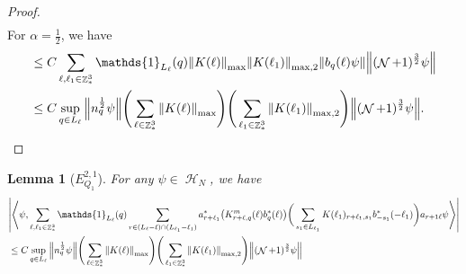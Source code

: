 \documentclass[sn-mathphys, Numbered ,a4paper]{sn-jnl}%
\DeclareMathOperator{\Z}{\mathbb{Z}}
\DeclareMathOperator{\HH}{\mathcal{H}}
\DeclareMathOperator{\NN}{\mathcal{N}}
\newcommand{\half}{\frac{1}{2}}
\newcommand{\eva}[1]{\left\langle #1 \right\rangle}
\theoremstyle{plain}
\newtheorem{lemma}[theorem]{Lemma}
\theoremstyle{definition}
\theoremstyle{remark}
\theoremstyle{plain}
\theoremstyle{definition}
\theoremstyle{remark}
\begin{document}
\begin{proof}
\begin{align}
    \end{align}
    For $\alpha = \half$, we have
    \begin{align}
    &\leq C\sum\limits_{\ell,\ell_1 \in \Z^3_*} \mathds{1}_{L_\ell}(q) \norm{K(\ell)}_{\mathrm{max}}\norm{K(\ell_1)}_{\mathrm{max},2}  \norm{b_{q}(\ell) \psi} \norm { (\NN+1)^{\frac{3}{2}} \psi }\nonumber\\
    &\leq C \sup\limits_{q \in L_\ell} \norm{n_{q}^{\half} \psi} \Bigg(\sum\limits_{\ell \in \Z^3_*} \norm{K(\ell)}_{\mathrm{max}}\Bigg)\Bigg( \sum\limits_{\ell_1 \in \Z^3_*}\norm{K(\ell_1)}_{\mathrm{max},2} \Bigg)  \norm { (\NN+1)^{\frac{3}{2}} \psi }. \label{eq:preleadbosest}
    \end{align}
\end{proof}
\begin{lemma}[$E_{Q_1}^{2,1}$]
	For any $\psi \in \HH_N$, we have
	\begin{align}
		&\abs{\eva{\psi,\sum\limits_{\ell,\ell_1 \in \Z^3_*} \mathds{1}_{L_\ell}(q) \sum\limits_{r \in (L_\ell-\ell) \cap (L_{\ell_1}-\ell_1)}a^*_{r+\ell_1} 
				\big(K^{m}_{r+\ell,q}(\ell)b^*_{q}(\ell)\big) \bigg( \sum\limits_{s_1 \in L_{\ell_1}} K(\ell_1)_{r+\ell_1,s_1}b^*_{-s_1}(-\ell_1) \bigg) a_{r+1\ell} \psi }}\nonumber\\
		&\leq  C \sup\limits_{q \in L_\ell} \norm{n_{q}^{\half} \psi} \Bigg(\sum\limits_{\ell \in \Z^3_*} \norm{K(\ell)}_{\mathrm{max}}\Bigg)\Bigg( \sum\limits_{\ell_1 \in \Z^3_*}\norm{K(\ell_1)}_{\mathrm{max},2} \Bigg)  \norm { (\NN+1)^{\frac{3}{2}} \psi } \label{eq:estEQ121}
	\end{align}
\end{lemma}
\end{document}
